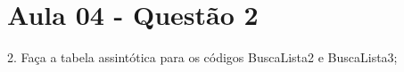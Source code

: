 \section{Aula 04 - Questão 2}

2. Faça a tabela assintótica para os
códigos BuscaLista2 e
BuscaLista3;